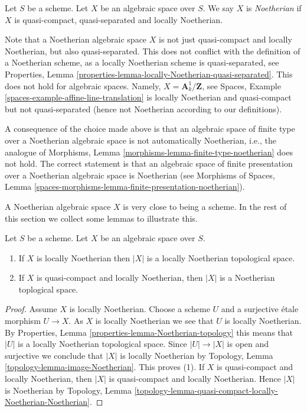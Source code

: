 \begin{definition}
\label{definition-noetherian}
Let $S$ be a scheme. Let $X$ be an algebraic space over $S$.
We say $X$ is {\it Noetherian} if $X$ is quasi-compact, quasi-separated
and locally Noetherian.
\end{definition}

\noindent
Note that a Noetherian algebraic space $X$ is not just quasi-compact
and locally Noetherian, but also quasi-separated. This does not conflict
with the definition of a Noetherian scheme, as a locally Noetherian
scheme is quasi-separated, see
Properties, Lemma \ref{properties-lemma-locally-Noetherian-quasi-separated}.
This does not hold for algebraic spaces. Namely,
$X = \mathbf{A}^1_k/\mathbf{Z}$, see
Spaces, Example \ref{spaces-example-affine-line-translation}
is locally Noetherian and quasi-compact but not quasi-separated
(hence not Noetherian according to our definitions).

\medskip\noindent
A consequence of the choice made above is that an algebraic space
of finite type over a Noetherian algebraic space is not automatically
Noetherian, i.e., the analogue of
Morphisms, Lemma \ref{morphisms-lemma-finite-type-noetherian}
does not hold. The correct statement is that an algebraic space of
finite presentation over a Noetherian algebraic space is Noetherian
(see
Morphisms of Spaces,
Lemma \ref{spaces-morphisms-lemma-finite-presentation-noetherian}).

\medskip\noindent
A Noetherian algebraic space $X$ is very close to being a scheme.
In the rest of this section we collect some lemmas to illustrate this.

\begin{lemma}
\label{lemma-Noetherian-topology}
Let $S$ be a scheme. Let $X$ be an algebraic space over $S$.
\begin{enumerate}
\item If $X$ is locally Noetherian then $|X|$ is a locally Noetherian
topological space.
\item If $X$ is quasi-compact and locally Noetherian, then $|X|$
is a Noetherian toplogical space.
\end{enumerate}
\end{lemma}

\begin{proof}
Assume $X$ is locally Noetherian.
Choose a scheme $U$ and a surjective \'etale morphism
$U \to X$. As $X$ is locally Noetherian we see that $U$ is locally
Noetherian. By
Properties, Lemma \ref{properties-lemma-Noetherian-topology}
this means that $|U|$ is a locally Noetherian topological space.
Since $|U| \to |X|$ is open and surjective we conclude that
$|X|$ is locally Noetherian by
Topology, Lemma \ref{topology-lemma-image-Noetherian}.
This proves (1). If $X$ is quasi-compact and locally Noetherian,
then $|X|$ is quasi-compact and locally Noetherian. Hence $|X|$
is Noetherian by
Topology,
Lemma \ref{topology-lemma-quasi-compact-locally-Noetherian-Noetherian}.
\end{proof}

